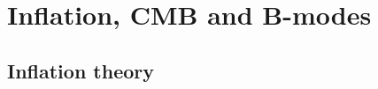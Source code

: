 \documentclass[../../thesis.tex]{subfiles}
\begin{document}
\chapter{Inflation, CMB and B-modes} \label{chap:inflation}
\minitoc

\section{Inflation theory}
\end{document}
